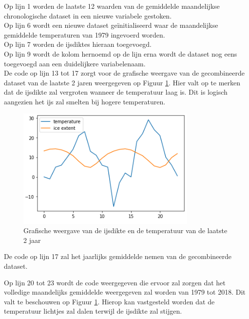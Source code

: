 Op lijn 1 worden de laatste 12 waarden van de gemiddelde maandelijkse chronologische dataset in een nieuwe variabele gestoken. \\
Op lijn 6 wordt een nieuwe dataset ge\"{i}nitialiseerd waar de maandelijkse gemiddelde temperaturen van 1979 ingevoerd worden.\\
Op lijn 7 worden de ijsdiktes hieraan toegevoegd. \\
Op lijn 9 wordt de kolom hernoemd op de lijn erna wordt de dataset nog eens toegevoegd aan een duidelijkere variabelenaam. \\

De code op lijn 13 tot 17 zorgt voor de grafische weergave van de gecombineerde dataset van de laatste 2 jaren weergegeven op Figuur \ref{fig:combinedlastyears}. Hier valt op te merken dat de ijsdikte zal vergroten wanneer de temperatuur laag is. Dit is logisch aangezien het ijs zal smelten bij hogere temperaturen. \\

\begin{figure}[!h]
    \centering
    \caption{Grafische weergave van de ijsdikte en de temperatuur van de laatste 2 jaar}
    \label{fig:combinedlastyears}
    \includegraphics[width=0.7\linewidth]{combined_last_years.PNG}
\end{figure}

De code op lijn 17 zal het jaarlijks gemiddelde nemen van de gecombineerde dataset.

Op lijn 20 tot 23 wordt de code weergegeven die ervoor zal zorgen dat het volledige maandelijks gemiddelde weergegeven zal worden van 1979 tot 2018. Dit valt te beschouwen op Figuur \ref{fig:combinedlastyears}. Hierop kan vastgesteld worden dat de temperatuur lichtjes zal dalen terwijl de ijsdikte zal stijgen.

